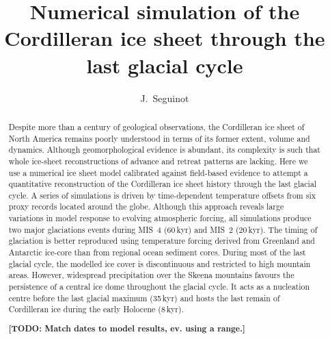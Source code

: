 \documentclass[tc, ms]{copernicus}
\def\todo#1{\textcolor[rgb]{0.5,0,0}{\textbf{[TODO: #1]}}}
\begin{document}
\hack{\sloppy}

\title{Numerical simulation of the Cordilleran ice sheet
       through the last glacial cycle}

\author[1,2]{J.~Seguinot}



\received{}
\accepted{}
\published{}

\maketitle

\begin{abstract}

  Despite more than a century of geological observations, the Cordilleran ice
  sheet of North America remains poorly understood in terms of its former
  extent, volume and dynamics. Although geomorphological evidence is abundant,
  its complexity is such that whole ice-sheet reconstructions of advance and
  retreat patterns are lacking. Here we use a numerical ice sheet model
  calibrated against field-based evidence to attempt a quantitative
  reconstruction of the Cordilleran ice sheet history through the last glacial
  cycle. A series of simulations is driven by time-dependent temperature
  offsets from six proxy records located around the globe. Although this
  approach reveals large variations in model response to evolving atmospheric
  forcing, all simulations produce two major glaciations events during MIS~4
  (60\,\unit{kyr}) and MIS~2 (20\,\unit{kyr}). The timing of glaciation is
  better reproduced using temperature forcing derived from Greenland and
  Antarctic ice-core than from regional ocean sediment cores. During most of
  the last glacial cycle, the modelled ice cover is discontinuous and
  restricted to high mountain areas. However, widespread precipitation over the
  Skeena mountains favours the persistence of a central ice dome throughout the
  glacial cycle. It acts as a nucleation centre before the last glacial maximum
  (35\,\unit{kyr}) and hosts the last remain of Cordilleran ice during the
  early Holocene (8\,\unit{kyr}).

  \todo{Match dates to model results, ev. using a range.}

\end{abstract}
\end{document}
